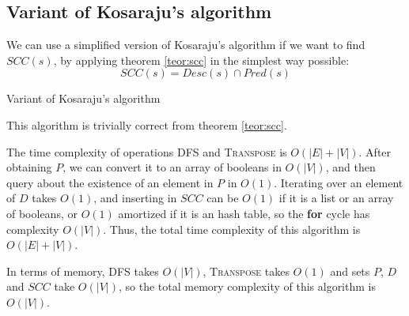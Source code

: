 \subsection{Variant of Kosaraju's algorithm} \label{algorithm-scc-kosaraju-v}
We can use a simplified version of Kosaraju's algorithm if we want to find $SCC(s)$, by applying theorem \ref{teor:scc} in the simplest way possible:
\begin{equation*}
    SCC(s) = Desc(s) \cap Pred(s)
\end{equation*}\par
\begin{algorithm}[h]
    \caption{Variant of Kosaraju's algorithm}
    \label{alg-kosaraju-v}
    \begin{algorithmic}[1]
             
             
            \State {}
        \EndFunction
    \end{algorithmic}
\end{algorithm}
This algorithm is trivially correct from theorem \ref{teor:scc}.\par
The time complexity of operations \textsc{DFS} and \textsc{Transpose} is $O(|E|+|V|)$. After obtaining $P$, we can convert it to an array of booleans in $O(|V|)$, and then query about the existence of an element in $P$ in $O(1)$. Iterating over an element of $D$ takes $O(1)$, and inserting in $SCC$ can be $O(1)$ if it is a list or an array of booleans, or $O(1)$ amortized if it is an hash table, so the \textbf{for} cycle has complexity $O(|V|)$. Thus, the total time complexity of this algorithm is $O(|E|+|V|)$.\par
In terms of memory, \textsc{DFS} takes $O(|V|)$, \textsc{Transpose} takes $O(1)$ and sets $P$, $D$ and $SCC$ take $O(|V|)$, so the total memory complexity of this algorithm is $O(|V|)$.
